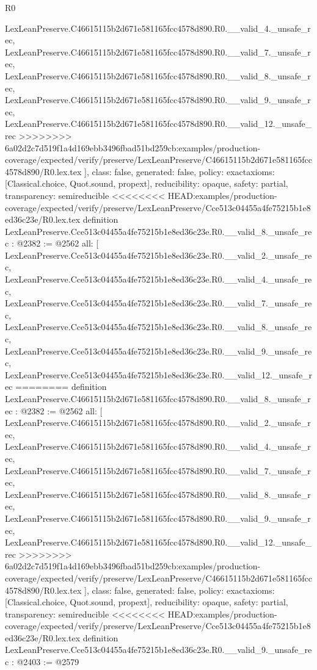 \begin{lexlean}{R0}
\begin{coremodule}
{{{{{{{{{{{{{{{{{{{{{{{{{{{{{{{{{{{{{{{{{{{{{{{{{{{{{    LexLeanPreserve.C46615115b2d671e581165fcc4578d890.R0.__valid_4._unsafe_rec,
    LexLeanPreserve.C46615115b2d671e581165fcc4578d890.R0.__valid_7._unsafe_rec,
    LexLeanPreserve.C46615115b2d671e581165fcc4578d890.R0.__valid_8._unsafe_rec,
    LexLeanPreserve.C46615115b2d671e581165fcc4578d890.R0.__valid_9._unsafe_rec,
    LexLeanPreserve.C46615115b2d671e581165fcc4578d890.R0.__valid_12._unsafe_rec
>>>>>>>> 6a02d2c7d519f1a4d169ebb3496fbad51bd259cb:examples/production-coverage/expected/verify/preserve/LexLeanPreserve/C46615115b2d671e581165fcc4578d890/R0.lex.tex
  ],
  class: false,
  generated: false,
  policy: exact{axioms: [Classical.choice, Quot.sound, propext]},
  reducibility: opaque{},
  safety: partial,
  transparency: semireducible
}
<<<<<<<< HEAD:examples/production-coverage/expected/verify/preserve/LexLeanPreserve/Cce513c04455a4fe75215b1e8ed36c23e/R0.lex.tex
definition LexLeanPreserve.Cce513c04455a4fe75215b1e8ed36c23e.R0.__valid_8._unsafe_rec : @2382 := @2562 {
  all: [
    LexLeanPreserve.Cce513c04455a4fe75215b1e8ed36c23e.R0.__valid_2._unsafe_rec,
    LexLeanPreserve.Cce513c04455a4fe75215b1e8ed36c23e.R0.__valid_4._unsafe_rec,
    LexLeanPreserve.Cce513c04455a4fe75215b1e8ed36c23e.R0.__valid_7._unsafe_rec,
    LexLeanPreserve.Cce513c04455a4fe75215b1e8ed36c23e.R0.__valid_8._unsafe_rec,
    LexLeanPreserve.Cce513c04455a4fe75215b1e8ed36c23e.R0.__valid_9._unsafe_rec,
    LexLeanPreserve.Cce513c04455a4fe75215b1e8ed36c23e.R0.__valid_12._unsafe_rec
========
definition LexLeanPreserve.C46615115b2d671e581165fcc4578d890.R0.__valid_8._unsafe_rec : @2382 := @2562 {
  all: [
    LexLeanPreserve.C46615115b2d671e581165fcc4578d890.R0.__valid_2._unsafe_rec,
    LexLeanPreserve.C46615115b2d671e581165fcc4578d890.R0.__valid_4._unsafe_rec,
    LexLeanPreserve.C46615115b2d671e581165fcc4578d890.R0.__valid_7._unsafe_rec,
    LexLeanPreserve.C46615115b2d671e581165fcc4578d890.R0.__valid_8._unsafe_rec,
    LexLeanPreserve.C46615115b2d671e581165fcc4578d890.R0.__valid_9._unsafe_rec,
    LexLeanPreserve.C46615115b2d671e581165fcc4578d890.R0.__valid_12._unsafe_rec
>>>>>>>> 6a02d2c7d519f1a4d169ebb3496fbad51bd259cb:examples/production-coverage/expected/verify/preserve/LexLeanPreserve/C46615115b2d671e581165fcc4578d890/R0.lex.tex
  ],
  class: false,
  generated: false,
  policy: exact{axioms: [Classical.choice, Quot.sound, propext]},
  reducibility: opaque{},
  safety: partial,
  transparency: semireducible
}
<<<<<<<< HEAD:examples/production-coverage/expected/verify/preserve/LexLeanPreserve/Cce513c04455a4fe75215b1e8ed36c23e/R0.lex.tex
definition LexLeanPreserve.Cce513c04455a4fe75215b1e8ed36c23e.R0.__valid_9._unsafe_rec : @2403 := @2579 {
}}}}}}}}}}}}}}}}}}}}}}}}}}}}}}}}}}}}}}}}}}}}}}}}}}}}}}
\end{coremodule}
\end{lexlean}
